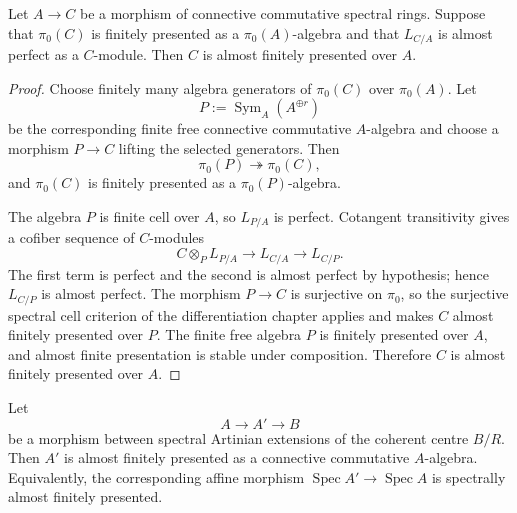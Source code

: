 \begin{proposition}
\label{prop:bnli-general-afp-cotangent}
Let $A\to C$ be a morphism of connective commutative spectral rings.  Suppose
that $\pi_0(C)$ is finitely presented as a $\pi_0(A)$-algebra and that
$L_{C/A}$ is almost perfect as a $C$-module.  Then $C$ is almost finitely
presented over $A$.
\end{proposition}

\begin{proof}
Choose finitely many algebra generators of $\pi_0(C)$ over $\pi_0(A)$.  Let
\[
    P:=\operatorname{Sym}_A(A^{\oplus r})
\]
be the corresponding finite free connective commutative $A$-algebra and choose
a morphism $P\to C$ lifting the selected generators.  Then
\[
    \pi_0(P)\twoheadrightarrow\pi_0(C),
\]
and $\pi_0(C)$ is finitely presented as a $\pi_0(P)$-algebra.

The algebra $P$ is finite cell over $A$, so $L_{P/A}$ is perfect.  Cotangent
transitivity gives a cofiber sequence of $C$-modules
\[
    C\otimes_PL_{P/A}
    \longrightarrow
    L_{C/A}
    \longrightarrow
    L_{C/P}.
\]
The first term is perfect and the second is almost perfect by hypothesis;
hence $L_{C/P}$ is almost perfect.  The morphism $P\to C$ is surjective on
$\pi_0$, so the surjective spectral cell criterion of the differentiation
chapter applies and makes $C$ almost finitely presented over $P$.  The finite
free algebra $P$ is finitely presented over $A$, and almost finite presentation
is stable under composition.  Therefore $C$ is almost finitely presented over
$A$.
\end{proof}

\begin{lemma}
\label{lem:bnli-artinian-morphism-afp}
Let
\[
    A\longrightarrow A'\longrightarrow B
\]
be a morphism between spectral Artinian extensions of the coherent centre
$B/R$.  Then $A'$ is almost finitely presented as a connective commutative
$A$-algebra.  Equivalently, the corresponding affine morphism
$\operatorname{Spec}A'\to\operatorname{Spec}A$ is spectrally almost finitely
presented.
\end{lemma}

